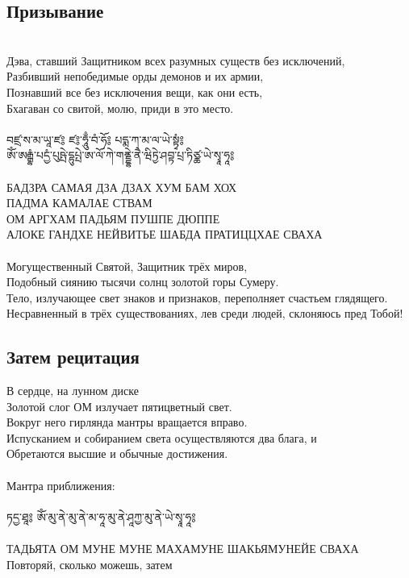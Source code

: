 \subsection*{Призывание}
\\
Дэва, ставший Защитником всех разумных существ без исключений,\\
Разбивший непобедимые орды демонов и их армии,\\
Познавший все без исключения вещи, как они есть,\\
Бхагаван со свитой, молю, приди в это место.\\
\\
\ti
བཛྲ་ས་མ་ཡཱ་ཛ༔ ཛ༔་ཧཱུྃ་བཾ་ཧོ༔ པདྨ་ཀ་མ་ལ་ཡེ་སྟྭཾ༔\\
ཨོཾ་ཨརྒྷཾ་པདྱཾ་པུཥྤེ་དྷུཔྤེ་ཨ་ལོ་ཀེ་གནྡྷེ་ནཻ་ཝིཏྱེ་ཤབྟ་པྲ་ཏིཙྪ་ཡེ་སྭཱ་ཧཱ༔\\
\\
\ru
БАДЗРА САМАЯ ДЗА ДЗАХ ХУМ БАМ ХОХ \\
ПАДМА КАМАЛАЕ СТВАМ\\
ОМ АРГХАМ ПАДЬЯМ ПУШПЕ ДЮППЕ\\
АЛОКЕ ГАНДХЕ НЕЙВИТЬЕ ШАБДА ПРАТИЦЦХАЕ СВАХА\\
\\
Могущественный Святой, Защитник трёх миров,\\
Подобный сиянию тысячи солнц золотой горы Сумеру.\\
Тело, излучающее свет знаков и признаков, переполняет счастьем глядящего.\\
Несравненный в трёх существованиях, лев среди людей, склоняюсь пред Тобой!

\subsection*{Затем рецитация}
В сердце, на лунном диске\\
Золотой слог ОМ излучает пятицветный свет.\\
Вокруг него гирлянда мантры вращается вправо.\\
Испусканием  и собиранием света осуществляются два блага, и\\
Обретаются высшие и обычные достижения.\\
\\
\scriptsize
Мантра приближения:\\
\normalsize
\\
\ti ཏདྱ་ཐཱ༔ ཨོཾ་མུ་ནེ་མུ་ནེ་མ་ཧཱ་མུ་ནེ་ཤཱཀྱ་མུ་ནེ་ཡེ་སྭཱ་ཧཱ༔\\
\noindent \ru \\
ТАДЬЯТА ОМ МУНЕ МУНЕ МАХАМУНЕ ШАКЬЯМУНЕЙЕ СВАХА\\
\scriptsize Повторяй, сколько можешь, затем \normalsize


